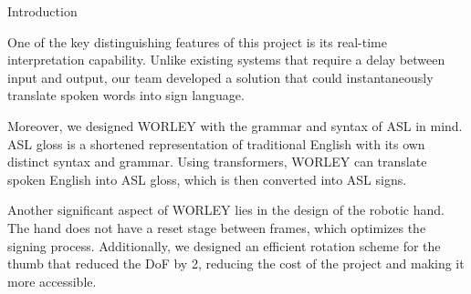 \documentclass[final, 20pt]{beamer}
\newlength{\colwidth}
\begin{document}
\begin{frame}[t]
\begin{columns}[t]
\begin{column}{\colwidth}
  \begin{block}{Introduction}

    One of the key distinguishing features of this project is its real-time interpretation capability. Unlike existing systems that require a delay between input and output, our team developed a solution that could instantaneously translate spoken words into sign language. 

    Moreover, we designed WORLEY with the grammar and syntax of ASL in mind. ASL gloss is a shortened representation of traditional English with its own distinct syntax and grammar. Using transformers, WORLEY can translate spoken English into ASL gloss, which is then converted into ASL signs.

    Another significant aspect of WORLEY lies in the design of the robotic hand. The hand does not have a reset stage between frames, which optimizes the signing process. Additionally, we designed an efficient rotation scheme for the thumb that reduced the DoF by 2, reducing the cost of the project and making it more accessible. 


  \end{block}

\end{column}

\separatorcolumn


\end{columns}
\end{frame}
\end{document}
